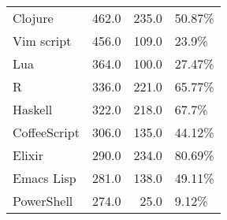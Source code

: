 \begin{table}
\begin{tabular}{lrrl}
Clojure          &        462.0 &     235.0 &        50.87\% \\
Vim script       &        456.0 &     109.0 &         23.9\% \\
Lua              &        364.0 &     100.0 &        27.47\% \\
R                &        336.0 &     221.0 &        65.77\% \\
Haskell          &        322.0 &     218.0 &         67.7\% \\
CoffeeScript     &        306.0 &     135.0 &        44.12\% \\
Elixir           &        290.0 &     234.0 &        80.69\% \\
Emacs Lisp       &        281.0 &     138.0 &        49.11\% \\
PowerShell       &        274.0 &      25.0 &         9.12\% \\

\end{tabular}
\end{table}
